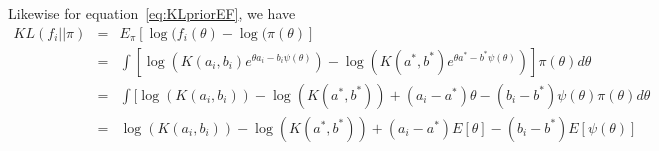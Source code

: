 \documentclass[a4paper, notitlepage, 11pt]{article}
\begin{document}
Likewise for equation~\ref{eq:KLpriorEF}, we have 
\begin{eqnarray*} 
KL(f_i || \pi) & = & E_\pi[\log(f_i(\theta)-\log(\pi(\theta)] \\
              & = & \int [\log( K(a_i,b_i) e^{\theta a_i - b_i \psi(\theta)}) - \log(K(a^*,b^*) e^{\theta a^* - b^* \psi(\theta)}) ] \pi(\theta) d\theta \\
              & = & \int [\log( K(a_i,b_i)) - \log(K(a^*,b^*)) + (a_i - a^*) \theta  - (b_i - b^*) \psi(\theta) \pi(\theta) d\theta \\
              & = & \log( K(a_i,b_i)) - \log(K(a^*,b^*)) + (a_i - a^*) E[\theta] - (b_i - b^*) E[\psi(\theta)] 
\end{eqnarray*}
\end{document}
